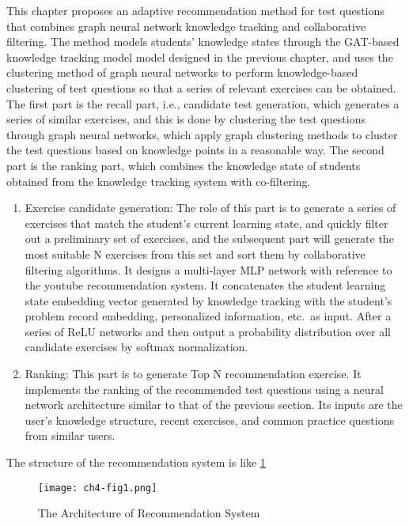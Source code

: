 This chapter proposes an adaptive recommendation method for test questions that combines graph neural network knowledge tracking and collaborative filtering. The method models students' knowledge states through the GAT-based knowledge tracking model model designed in the previous chapter, and uses the clustering method of graph neural networks to perform knowledge-based clustering of test questions so that a series of relevant exercises can be obtained. The first part is the recall part, i.e., candidate test generation, which generates a series of similar exercises, and this is done by clustering the test questions through graph neural networks, which apply graph clustering methods to cluster the test questions based on knowledge points in a reasonable way. The second part is the ranking part, which combines the knowledge state of students obtained from the knowledge tracking system with co-filtering.
\begin{enumerate}
  \item Exercise candidate generation: The role of this part is to generate a series of exercises that match the student's current learning state, and quickly filter out a preliminary set of exercises, and the subsequent part will generate the most suitable N exercises from this set and sort them by collaborative filtering algorithms. It designs a multi-layer MLP network with reference to the youtube recommendation system. It concatenates the student learning state embedding vector generated by knowledge tracking with the student's problem record embedding, personalized information, etc.\ as input. After a series of ReLU networks and then output a probability distribution over all candidate exercises by softmax normalization.
  \item Ranking: This part is to generate Top N recommendation exercise. It implements the ranking of the recommended test questions using a neural network architecture similar to that of the previous section. Its inputs are the user's knowledge structure, recent exercises, and common practice questions from similar users.
\end{enumerate}

The structure of the recommendation system is like \figurename{\ref{fig:ch4-fig0}}

\begin{figure}[h]
  \centering
  \texttt{[image: ch4-fig1.png]}
  \caption{The Architecture of Recommendation System}\label{fig:ch4-fig0}
\end{figure}

